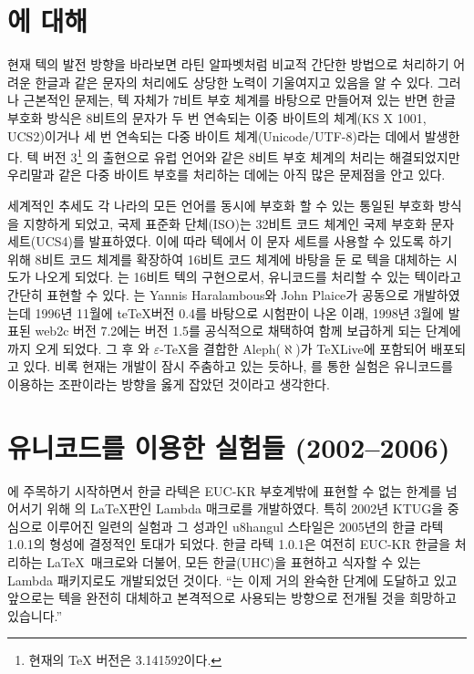 \section{\OMEGA{}에 대해}
\label{sec:future}

현재 텍의 발전 방향을 바라보면 라틴 알파벳처럼 비교적 간단한 방법으로
처리하기 어려운 한글과 같은 문자의 처리에도 상당한 노력이 기울여지고 
있음을 알 수 있다.
그러나 근본적인 문제는, 텍 자체가
7비트 부호 체계를 바탕으로 만들어져 있는 반면 한글 부호화 방식은
8비트의 문자가 두 번 연속되는 이중 바이트의 체계(KS X 1001, UCS2)이거나
세 번 연속되는 다중 바이트 체계(Unicode/UTF-8)라는
데에서 발생한다.  텍 버전 3\footnote{현재의 \TeX{} 버전은 3.141592이다.}%
의 출현으로 유럽 언어와 같은 8비트 부호
체계의 처리는 해결되었지만 우리말과 같은 다중 바이트 부호를 처리하는 데에는
아직 많은 문제점을 안고 있다.

세계적인 추세도 각 나라의 모든 언어를 동시에 부호화 할 수 있는 통일된
부호화 방식을 지향하게 되었고, 국제 표준화 단체(ISO)는 32비트 코드 체계인
국제 부호화 문자 세트(UCS4)를 발표하였다.  이에 따라 텍에서 이 문자
세트를 사용할 수 있도록 하기 위해 8비트 코드 체계를 확장하여 16비트
코드 체계에 바탕을 둔 \OMEGA{}로 텍을 대체하는 시도가 나오게
되었다.  \OMEGA{}는 16비트 텍의 구현으로서, 유니코드를
처리할 수 있는 텍이라고 간단히 표현할 수 있다.  \OMEGA{}는 
Yannis Haralambous와 John
Plaice가 공동으로 개발하였는데 1996년
11월에 te\TeX 버전 0.4를 바탕으로 시험판이 나온 이래, 
1998년 3월에 발표된 web2c 버전 7.2에는
\OMEGA{} 버전 1.5를 공식적으로 채택하여 함께 보급하게 되는 단계에까지
오게 되었다. 그 후 \OMEGA 와 $\varepsilon$-\TeX 을 결합한
Aleph($\aleph$)가 \TeX{}Live에 포함되어 배포되고 있다.
비록 현재는 개발이 잠시 주춤하고 있는 듯하나, \OMEGA 를 통한 실험은
유니코드를 이용하는 조판이라는 방향을 옳게 잡았던 것이라고 생각한다.

\section{유니코드를 이용한 실험들 (2002--2006)}

\OMEGA 에 주목하기 시작하면서 한글 라텍은 EUC-KR 부호계밖에 표현할
수 없는 한계를 넘어서기 위해 \OMEGA 의 \LaTeX 판인 Lambda
매크로를 개발하였다.
특히 2002년 KTUG을 중심으로 이루어진 일련의
실험과 그 성과인 u8hangul 스타일은 2005년의 한글 라텍 1.0.1의
형성에 결정적인 토대가 되었다. 한글 라텍 1.0.1은 여전히 EUC-KR 
한글을 처리하는 \LaTeX\ 매크로와 더불어, 모든 한글(UHC)을 표현하고
식자할 수 있는 Lambda 패키지로도 개발되었던 것이다. ``\OMEGA{}는 이제 거의 완숙한 단계에 도달하고 있고 앞으로는
텍을 완전히 대체하고 본격적으로 사용되는 방향으로 전개될 것을 희망하고
있습니다.''\cite{hlguide}

